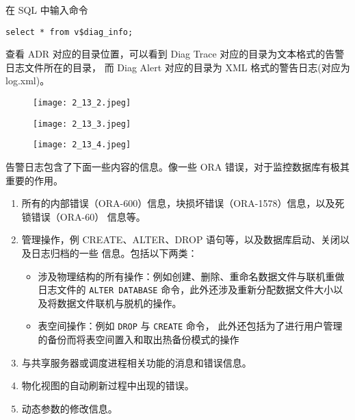 在 SQL 中输入命令
\begin{verbatim}
select * from v$diag_info;
\end{verbatim}
查看 ADR 对应的目录位置，可以看到 Diag Trace 对应的目录为文本格式的告警日志文件所在的目录，
而 Diag Alert 对应的目录为 XML 格式的警告日志(对应为 log.xml)。
\begin{figure}[H]
  \begin{center}
    \texttt{[image: 2\_13\_2.jpeg]}
  \end{center}
\end{figure}
\begin{figure}[H]
  \begin{center}
    \texttt{[image: 2\_13\_3.jpeg]}
  \end{center}
\end{figure}
\begin{figure}[H]
  \begin{center}
    \texttt{[image: 2\_13\_4.jpeg]}
  \end{center}
\end{figure}

告警日志包含了下面一些内容的信息。像一些 ORA 错误，对于监控数据库有极其重要的作用。
\begin{enumerate}
  \item 所有的内部错误（ORA-600）信息，块损坏错误（ORA-1578）信息，以及死锁错误（ORA-60）
    信息等。
  \item 管理操作，例 CREATE、ALTER、DROP 语句等，以及数据库启动、关闭以及日志归档的一些
    信息。包括以下两类：
    \begin{itemize}
      \item 涉及物理结构的所有操作：例如创建、删除、重命名数据文件与联机重做日志文件的
        \texttt{ALTER DATABASE} 命令，此外还涉及重新分配数据文件大小以及将数据文件联机与脱机的操作。
      \item 表空间操作：例如 \texttt{DROP} 与 \texttt{CREATE} 命令，
        此外还包括为了进行用户管理的备份而将表空间置入和取出热备份模式的操作
    \end{itemize}
  \item 与共享服务器或调度进程相关功能的消息和错误信息。
  \item 物化视图的自动刷新过程中出现的错误。
  \item 动态参数的修改信息。
\end{enumerate}

